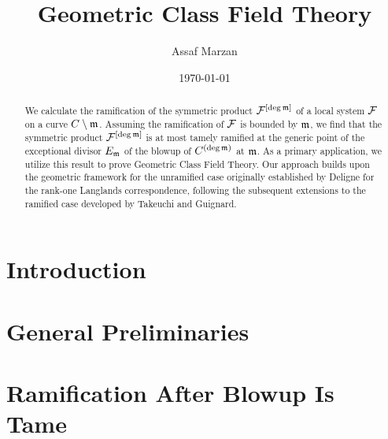 \documentclass[11pt]{report}
\begin{document}
\title{Geometric Class Field Theory}
\author{Assaf Marzan}
\date{\today}
\maketitle
\begin{abstract}
We calculate the ramification of the symmetric product $\mathcal{F}^{[\deg \mathfrak{m}]}$ of a local system $\mathcal{F}$ on a curve $C \setminus \mathfrak{m}$. 
Assuming the ramification of $\mathcal{F}$ is bounded by $\mathfrak{m}$, we find that the symmetric product $\mathcal{F}^{[\deg \mathfrak{m}]}$ is at most tamely ramified at the generic point of 
the exceptional divisor $E_{\mathfrak{m}}$ of the blowup of $C^{(\deg \mathfrak{m})}$ at $\mathfrak{m}$. As a primary application, 
we utilize this result to prove Geometric Class Field Theory. Our approach builds upon the geometric framework for the unramified case originally established by Deligne for the rank-one Langlands correspondence, 
following the subsequent extensions to the ramified case developed by Takeuchi and Guignard.
\end{abstract}

\newpage
\tableofcontents
\newpage
\chapter*{Introduction}



\chapter{General Preliminaries}\label{chapter:general_preliminaries}



\chapter{Ramification After Blowup Is Tame}\label{section:ramification_after_blowup_is_tame}










\end{document}
